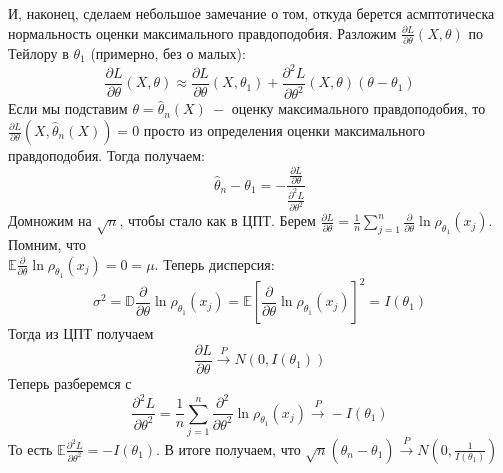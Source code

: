 \begin{remark}
И, наконец, сделаем небольшое замечание о том, откуда берется асмптотическа нормальность оценки максимального правдоподобия. Разложим $\frac{\partial L}{\partial \theta}\left(X, \theta\right)$ по Тейлору в $\theta_1$ (примерно, без о малых):
\[
    \frac{\partial L}{\partial \theta}\left(X, \theta\right) \approx \frac{\partial L}{\partial \theta}\left(X, \theta_1\right) + \frac{\partial ^ 2 L}{\partial \theta ^ 2}\left(X, \theta\right)\left(\theta - \theta_1\right)
\]
Если мы подставим $\theta = \widehat{\theta}_n\left(X\right) \ - $ оценку максимального правдоподобия, то $\frac{\partial L}{\partial \theta}\left(X, \widehat{\theta}_n\left(X\right)\right) = 0$ просто из определения оценки максимального правдоподобия. Тогда получаем:
\[
    \widehat{\theta}_n - \theta_1 = -\frac{\frac{\partial L}{\partial \theta}}{\frac{\partial ^ 2 L}{\partial \theta ^ 2}}
\]
Домножим на $\sqrt{n}$, чтобы стало как в ЦПТ. Берем $\frac{\partial L}{\partial \theta} = \frac 1 n \sum_{j = 1}^{n} \frac{\partial}{\partial \theta} \ln \rho_{\theta_1}\left(x_j\right)$. Помним, что \\ $\mathbb{E} \frac{\partial}{\partial \theta} \ln \rho_{\theta_1}\left(x_j\right) = 0 = \mu$. Теперь дисперсия: 
\[\sigma ^ 2 = \mathbb{D} \frac{\partial}{\partial \theta} \ln \rho_{\theta_1}\left(x_j\right) = \mathbb{E} \left[\frac{\partial}{\partial \theta} \ln \rho_{\theta_1}\left(x_j\right)\right] ^ 2 = I\left(\theta_1\right)
\]
Тогда из ЦПТ получаем
\[
    \frac{\partial L}{\partial \theta} \xrightarrow{P} N\left(0, I\left(\theta_1\right)\right)
\]
Теперь разберемся с 
\[
    \frac{\partial ^ 2 L}{\partial \theta ^ 2} = \frac 1 n \sum_{j = 1}^{n} \frac{\partial ^ 2}{\partial \theta ^ 2} \ln \rho_{\theta_1}\left(x_j\right) \xrightarrow{P} -I\left(\theta_1\right)
\]
То есть $\mathbb{E}\frac{\partial ^ 2 L}{\partial \theta ^ 2} = -I\left(\theta_1\right)$. В итоге получаем, что $\sqrt{n}\left(\widehat{\theta}_n - \theta_1\right) \xrightarrow{P} N\left(0, \frac 1 {I\left(\theta_1\right)}\right)$
\end{remark}


